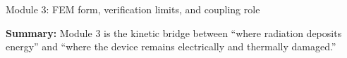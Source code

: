 \documentclass[aspectratio=169,8pt]{beamer}
\begin{document}
\begin{frame}{Module 3: FEM form, verification limits, and coupling role}
\vspace{0.5mm}
\begin{purplebox}
\centering\scriptsize
\textbf{Summary:} Module 3 is the kinetic bridge between ``where radiation deposits energy'' and ``where the device remains electrically and thermally damaged.''
\end{purplebox}
\end{frame}
\end{document}

